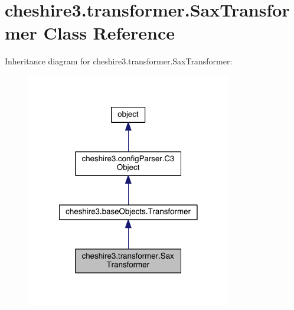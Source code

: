 \hypertarget{classcheshire3_1_1transformer_1_1_sax_transformer}{\section{cheshire3.\-transformer.\-Sax\-Transformer Class Reference}
\label{classcheshire3_1_1transformer_1_1_sax_transformer}
}


Inheritance diagram for cheshire3.\-transformer.\-Sax\-Transformer\-:
\nopagebreak
\begin{figure}[H]
\begin{center}
\leavevmode
\includegraphics[width=254pt]{classcheshire3_1_1transformer_1_1_sax_transformer__inherit__graph}
\end{center}
\end{figure}


